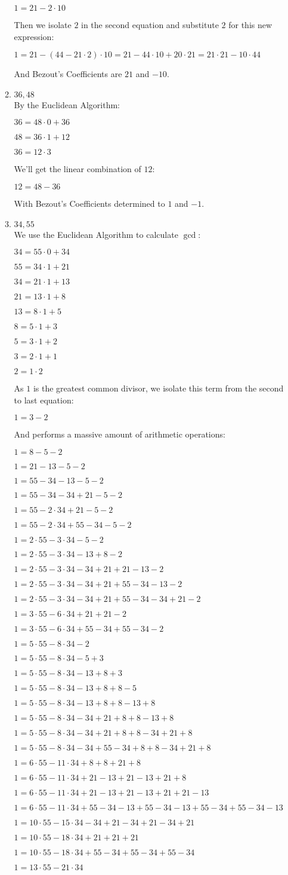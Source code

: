 \documentclass{report}
\newcommand{\cent}[1]{\begin{center}#1\end{center}}
\newcommand{\defaultEnumerateLabel}{\textbf{\alph*.}}
\newcommand{\MyItem}[1]{\item #1\\}
\begin{document}
\begin{enumerate}[label=\defaultEnumerateLabel]
\begin{enumerate}[label=\defaultEnumerateLabel]
		\cent{$1 = 21 - 2 \cdot 10 $}
		
		Then we isolate $2$ in the second equation and substitute $2$ for this new expression:
		
		\cent{$1 = 21 - (44 - 21 \cdot 2) \cdot 10 = 21 - 44 \cdot 10 + 20 \cdot 21 = 21\cdot 21 - 10 \cdot 44 $}
		
		And Bezout's Coefficients are $21$ and $-10$.\\
		
		\MyItem{$36, 48$}
		
		By the Euclidean Algorithm:
		
		\cent{$36 = 48 \cdot 0 + 36$}
		\cent{$48 = 36 \cdot 1 + 12$}
		\cent{$36 = 12 \cdot 3$}
		
		We'll get the linear combination of $12$:
		
		\cent{$12 = 48 - 36$}
		
		With Bezout's Coefficients determined to $1$ and $-1$.
		
		\MyItem{$34,55$}
		
		We use the Euclidean Algorithm to calculate $\gcd$:
		
		\cent{$34 = 55 \cdot 0 + 34$}
		\cent{$55 =  34 \cdot 1 + 21$}
		\cent{$34 = 21 \cdot 1 + 13$}
		\cent{$21 = 13 \cdot 1 + 8$}
		\cent{$13 = 8 \cdot 1 + 5$}
		\cent{$8 = 5 \cdot 1 + 3$}
		\cent{$5 = 3 \cdot 1 + 2$}
		\cent{$3 = 2 \cdot 1 + 1$}
		\cent{$2 = 1 \cdot 2 $}
		As $1$ is the greatest common divisor, we isolate this term from the second to last equation:
		\cent{$1 = 3 -2$}
		
		And performs a massive amount of arithmetic operations:
		\cent{$1 = 8-5 -2$}
		\cent{$1 = 21-13-5 -2$}
		\cent{$1 = 55-34-13-5 -2$}
		\cent{$1 = 55-34-34+ 21-5 -2$}
		\cent{$1 = 55-2 \cdot 34+21-5 -2$}
		\cent{$1 = 55-2 \cdot 34+55-34-5 -2$}
		\cent{$1 = 2 \cdot 55-3 \cdot 34-5-2$}
		\cent{$1 = 2 \cdot 55-3 \cdot 34-13+8-2$}
		\cent{$1 = 2 \cdot 55-3 \cdot 34-34+21+21-13-2$}
		\cent{$1 = 2 \cdot 55-3 \cdot 34-34+21+55-34-13-2$}
		\cent{$1 = 2 \cdot 55-3 \cdot 34-34+21+55-34-34+21-2$}
		\cent{$1 = 3 \cdot 55-6 \cdot 34+21+21-2$}
		\cent{$1 = 3 \cdot 55-6 \cdot 34+55-34+55-34-2$}
		\cent{$1 = 5 \cdot 55-8 \cdot 34-2$}
		\cent{$1 = 5 \cdot 55-8 \cdot 34-5+3$}
		\cent{$1 = 5 \cdot 55-8 \cdot 34-13+8+3$}
		\cent{$1 = 5 \cdot 55-8 \cdot 34-13+8+8-5$}
		\cent{$1 = 5 \cdot 55-8 \cdot 34-13+8+8-13+8$}
		\cent{$1 = 5 \cdot 55-8 \cdot 34-34+21+8+8-13+8$}
		\cent{$1 = 5 \cdot 55-8 \cdot 34-34+21+8+8-34+21+8$}
		\cent{$1 = 5 \cdot 55-8 \cdot 34-34+55-34+8+8-34+21+8$}
		\cent{$1 = 6 \cdot 55-11 \cdot 34+8+8+21+8$}
		\cent{$1 = 6 \cdot 55-11 \cdot 34+21-13+21-13+21+8$}
		\cent{$1 = 6 \cdot 55-11 \cdot 34+21-13+21-13+21+21-13$}
		\cent{$1 = 6 \cdot 55-11 \cdot 34+55-34-13+55-34-13+55-34+55-34-13$}
		\cent{$1 = 10 \cdot 55-15 \cdot 34-34+21-34+21-34+21$}
		\cent{$1 = 10 \cdot 55-18 \cdot 34+21+21+21$}
		\cent{$1 = 10 \cdot 55-18 \cdot 34+55-34+55-34+55-34$}
		\cent{$1 = 13 \cdot 55-21 \cdot 34$}
		

\end{enumerate}
\end{enumerate}
\end{document}
